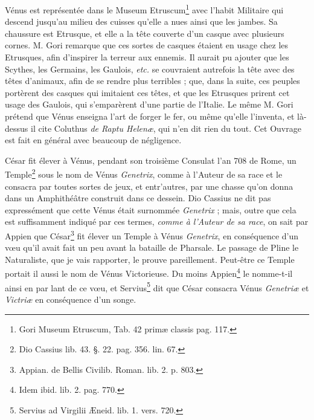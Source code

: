 \documentclass[a4paper, 11pt, oneside, polutonikogreek, french]{article}
\begin{document}
Vénus est représentée dans le Museum Etruscum\footnote{Gori Museum Etruscum, Tab. 42 primæ classis pag. 117.} avec l'habit Militaire qui descend jusqu'au milieu des cuisses qu'elle a nues ainsi que les jambes. Sa chaussure est Etrusque, et elle a la tête couverte d'un casque avec plusieurs cornes. M. Gori remarque que ces sortes de casques étaient en usage chez les Etrusques, afin d'inspirer la terreur aux ennemis. Il aurait pu ajouter que les Scythes, les Germains, les Gaulois, \emph{etc.} se couvraient autrefois la tête avec des têtes d'animaux, afin de se rendre plus terribles ; que, dans la suite, ces peuples portèrent des casques qui imitaient ces têtes, et que les Etrusques prirent cet usage des Gaulois, qui s'emparèrent d'une partie de l'Italie. Le même M. Gori prétend que Vénus enseigna l'art de forger le fer, ou même qu'elle l'inventa, et là-dessus il cite Coluthus \emph{de Raptu Helenæ}, qui n'en dit rien du tout. Cet Ouvrage est fait en général avec beaucoup de négligence.

César fit élever à Vénus, pendant son troisième Consulat l'an 708 de Rome, un Temple\footnote{Dio Cassius lib. 43. §. 22. pag. 356. lin. 67.} sous le nom de Vénus \emph{Genetrix}, comme à l'Auteur de sa race et le consacra par toutes sortes de jeux, et entr'autres, par une chasse qu'on donna dans un Amphithéâtre construit dans ce dessein. Dio Cassius ne dit pas expressément que cette Vénus était surnommée \emph{Genetrix} ; mais, outre que cela est suffisamment indiqué par ces termes, \emph{comme à l'Auteur de sa race}, on sait par Appien que César\footnote{Appian. de Bellis Civilib. Roman. lib. 2. p. 803.} fit élever un Temple à Vénus \emph{Genetrix}, en conséquence d'un vœu qu'il avait fait un peu avant la bataille de Pharsale. Le passage de Pline le Naturaliste, que je vais rapporter, le prouve pareillement. Peut-être ce Temple portait il aussi le nom de Vénus Victorieuse. Du moins Appien\footnote{Idem ibid. lib. 2. pag. 770.} le nomme-t-il ainsi en par lant de ce vœu, et Servius\footnote{Servius ad Virgilii Æneid. lib. 1. vers. 720.} dit que César consacra Vénus \emph{Genetriæ} et \emph{Victriæ} en conséquence d'un songe.
\end{document}
